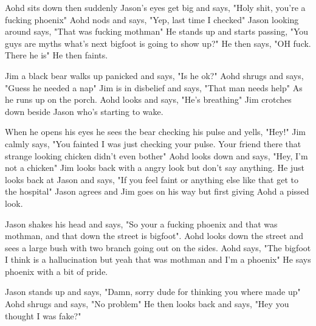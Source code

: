 \documentclass{memoir}[12px]
\begin{document}
Aohd sits down then suddenly Jason's eyes get big and says, "Holy shit, you're a fucking phoenix" Aohd nods and says, "Yep, last time I checked" Jason looking around says, "That was fucking mothman" He stands up and starts passing, "You guys are myths what's next bigfoot is going to show up?" He then says, "OH fuck. There he is" He then faints. 

Jim a black bear walks up panicked and says, "Is he ok?" Aohd shrugs and says, "Guess he needed a nap" Jim is in disbelief and says, "That man needs help" As he runs up on the porch. Aohd looks and says, "He's breathing" Jim crotches down beside Jason who's starting to wake. 

When he opens his eyes he sees the bear checking his pulse and yells, "Hey!" Jim calmly says, "You fainted I was just checking your pulse. Your friend there that strange looking chicken didn't even bother" Aohd looks down and says, "Hey, I'm not a chicken" Jim looks back with a angry look but don't say anything. He just looks back at Jason and says, "If you feel faint or anything else like that get to the hospital" Jason agrees and Jim goes on his way but first giving Aohd a pissed look.

Jason shakes his head and says, "So your a fucking phoenix and that was mothman, and that down the street is bigfoot". Aohd looks down the street and sees a large bush with two branch going out on the sides. Aohd says, "The bigfoot I think is a hallucination but yeah that was mothman and I'm a phoenix" He says phoenix with a bit of pride. 

Jason stands up and says, "Damn, sorry dude for thinking you where made up" Aohd shrugs and says, "No problem" He then looks back and says, "Hey you thought I was fake?"
\end{document}
